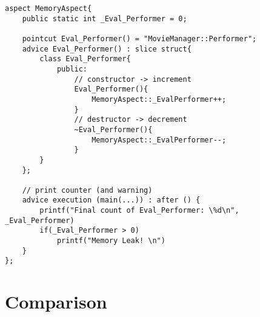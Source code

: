 \lstset {language=C++}
\begin{lstlisting}[caption={\textbf{Generated Counter Aspect Code.}}, label=mem]
aspect MemoryAspect{
	public static int _Eval_Performer = 0;

	pointcut Eval_Performer() = "MovieManager::Performer";
	advice Eval_Performer() : slice struct{
		class Eval_Performer{
			public:
				// constructor -> increment
				Eval_Performer(){
					MemoryAspect::_EvalPerformer++;
				}
				// destructor -> decrement
				~Eval_Performer(){
					MemoryAspect::_EvalPerformer--;
				} 
		} 
	};

	// print counter (and warning)
	advice execution (main(...)) : after () {
		printf("Final count of Eval_Performer: \%d\n",  _Eval_Performer)
		if(_Eval_Performer > 0)
			printf("Memory Leak! \n")
	}
};
\end{lstlisting}

\newpage
\section{Comparison} \label{compare}

